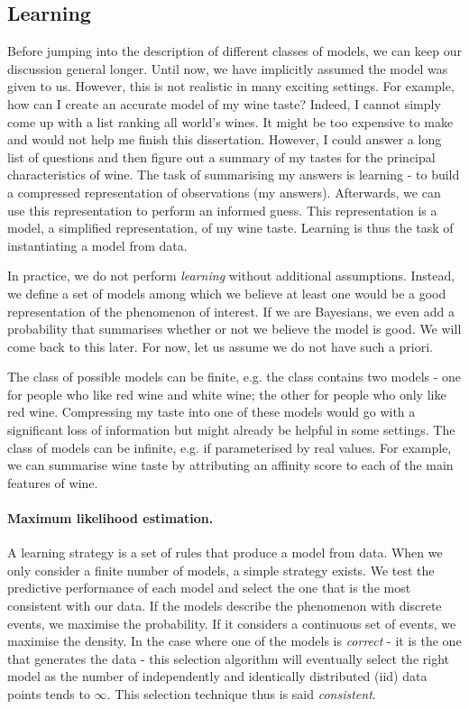 \subsection{Learning}
Before jumping into the description of different classes of models, we can keep our discussion general longer.
Until now, we have implicitly assumed the model was given to us. However, this is not realistic in many exciting settings. For example, how can I create an accurate model of my wine taste? Indeed, I cannot simply come up with a list ranking all world's wines. It might be too expensive to make and would not help me finish this dissertation. However, I could answer a long list of questions and then figure out a summary of my tastes for the principal characteristics of wine. The task of summarising my answers is learning - to build a compressed representation of observations (my answers). Afterwards, we can use this representation to perform an informed guess. This representation is a model, a simplified representation, of my wine taste. Learning is thus the task of instantiating a model from data.

In practice, we do not perform \textit{learning} without additional assumptions. Instead, we define a set of models among which we believe at least one would be a good representation of the phenomenon of interest. If we are Bayesians, we even add a probability that summarises whether or not we believe the model is good. We will come back to this later. For now, let us assume we do not have such a priori.

The class of possible models can be finite, e.g. the class contains two models - one for people who like red wine and white wine; the other for people who only like red wine. Compressing my taste into one of these models would go with a significant loss of information but might already be helpful in some settings. The class of models can be infinite, e.g. if parameterised by real values. For example, we can summarise wine taste by attributing an affinity score to each of the main features of wine.
\paragraph{Maximum likelihood estimation.}
A learning strategy is a set of rules that produce a model from data. When we only consider a finite number of models, a simple strategy exists. We test the predictive performance of each model and select the one that is the most consistent with our data. If the models describe the phenomenon with discrete events, we maximise the probability. If it considers a continuous set of events, we maximise the density. In the case where one of the models is \textit{correct} - it is the one that generates the data - this selection algorithm will eventually select the right model as the number of independently and identically distributed (iid) data points tends to $\infty$. This selection technique thus is said \textit{consistent}.

